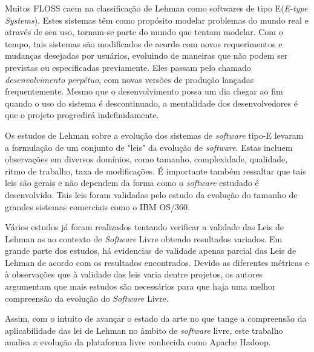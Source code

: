 Muitos FLOSS caem na classificação de Lehman\cite{belady1976model} como softwares de tipo E(\textit{E-type Systems}). Estes sistemas têm como propósito modelar problemas do mundo real e através de seu uso, tornam-se parte do mundo que tentam modelar. Com o tempo, tais sistemas são modificados de acordo com novos requerimentos e mudanças desejadas por usuários, evoluindo de maneiras que não podem ser previstas ou especificadas previamente. Eles passam pelo chamado \textit{desenvolvimento perpétuo}\cite{lehman1996laws}, com novas versões de produção lançadas frequentemente. Mesmo que o desenvolvimento possa um dia chegar ao fim quando o uso do sistema é descontinuado, a mentalidade dos desenvolvedores é que o projeto progredirá indefinidamente.

Os estudos de Lehman sobre a evolução dos sistemas de \textit{software} tipo-E levaram a formulação de um conjunto de "leis" da evolução de \textit{software}. Estas incluem observações em diversos domínios, como tamanho, complexidade, qualidade, ritmo de trabalho, taxa de modificações. É importante também ressaltar que tais leis são gerais e não dependem da forma como o \textit{software} estudado é desenvolvido. Tais leis foram validadas pelo estudo da evolução do tamanho de grandes sistemas comerciais como o IBM OS/360\cite{lehman1979understanding,lehman1985program}. 

Vários estudos já foram realizados tentando verificar a validade das Leis de Lehman as ao contexto de \textit{Software} Livre obtendo resultados variados. Em grande parte dos estudos, há evidencias de validade apenas parcial das Leis de Lehman de acordo com os resultados encontrados\cite{lehman1979understanding,lehman1985program,israeli2010linux,carver2004impact}. Devido as diferentes métricas e à observações que à validade das leis varia dentre projetos, os autores argumentam que mais estudos são necessários para que haja uma melhor compreensão da evolução do \textit{Software} Livre\cite{scacchi2003understanding,neamtiu2013towards,israeli2010linux}.

Assim, com o intuito de avançar o estado da arte no que tange a compreensão da aplicabilidade das lei de Lehman no âmbito de \textit{software} livre, este trabalho analisa a evolução da plataforma livre conhecida como Apache Hadoop.

